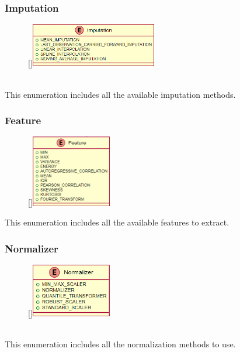 \subsubsection{Imputation}
\label{Imputation}
\begin{figure}
    \raisebox{0pt}[\dimexpr{}\baselineskip\relax]{\includegraphics[width=5.5cm]{classes/model-management/5.png}}
\end{figure} 
~\\
This enumeration includes all the available imputation methods.
\newline
\newline
\newline
\newpage
\subsubsection{Feature}
\label{Feature}
\begin{figure}
    \raisebox{0pt}[\dimexpr{}\baselineskip\relax]{\includegraphics[width=3.5cm]{classes/model-management/6.png}}
\end{figure} 
This enumeration includes all the available features to extract.
\newline
\newline
\newline
\newline
\newline
\subsubsection{Normalizer}
\label{Normalizer}
\begin{figure}
    \raisebox{0pt}[\dimexpr{}\baselineskip\relax]{\includegraphics[width=3.5cm]{classes/model-management/7.png}}
\end{figure} 
~\\
This enumeration includes all the normalization methods to use.
\newline
\newline
\newline
\newline
